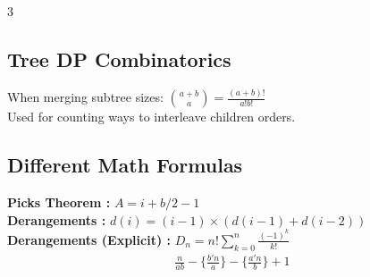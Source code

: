 \begin{multicols*}{3}
\subsection{Tree DP Combinatorics}
When merging subtree sizes: $\displaystyle {a+b \choose a}=\frac{(a+b)!}{a!b!}$ \\
Used for counting ways to interleave children orders. \\

\subsection{Different Math Formulas}
\textbf{Picks Theorem : } $ A = i + b / 2 - 1 $ \\ 
\textbf{Derangements : } $ d(i) = (i - 1) \times \left( d(i - 1) + d(i - 2) \right) $ \\ 
\textbf{Derangements (Explicit) : } $\displaystyle D_{n}=n!\sum_{k=0}^{n}\frac{(-1)^{k}}{k!}$ \\
\begin{multline*}
\displaystyle \frac{n}{ab}-\Big\{\frac{b{\prime} n}{a}\Big\}-\Big\{\frac{a{\prime} n}{b}\Big\} + 1
\end{multline*}


\end{multicols*}
